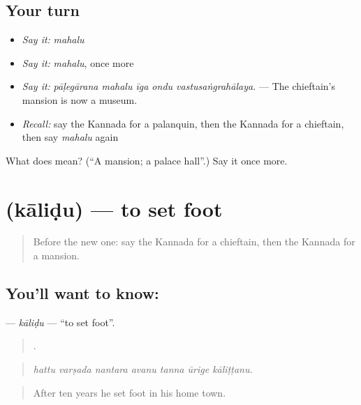 \subsection*{Your turn}
\begin{itemize}
\raggedright
  \item \emph{Say it:} \emph{mahalu}
  \item \emph{Say it:} \emph{mahalu}, once more
  \item \emph{Say it:} \emph{pāḷegārana mahalu īga ondu vastusaṅgrahālaya.} — The chieftain's mansion is now a museum.
  \item \emph{Recall:} say the Kannada for a palanquin, then the Kannada for a chieftain, then say \emph{mahalu} again
\end{itemize}

\begin{tcolorbox}[breakable,colback=teal!4,colframe=teal!35!black,title={Before you move on}]
What does  mean? (\textquotedblleft{}A mansion; a palace hall\textquotedblright{}.) Say it once more.
\end{tcolorbox}
\section[\texorpdfstring{\kn{ಕಾಲಿಡು} (kāliḍu)}{ಕಾಲಿಡು (kāliḍu)}]{ (kāliḍu) — to set foot}

\label{lesson:KA-C371-kalidu}



\begin{quote}
Before the new one: say the Kannada for a chieftain, then the Kannada for a mansion.
\end{quote}

\subsection*{You'll want to know: }
\textbf{} — \emph{kāliḍu} — \textquotedblleft{}to set foot\textquotedblright{}.

\begin{quote}
      .
\end{quote}

\begin{quote}
\emph{hattu varṣada nantara avanu tanna ūrige kāliṭṭanu.}
\end{quote}

\begin{quote}
After ten years he set foot in his home town.
\end{quote}


